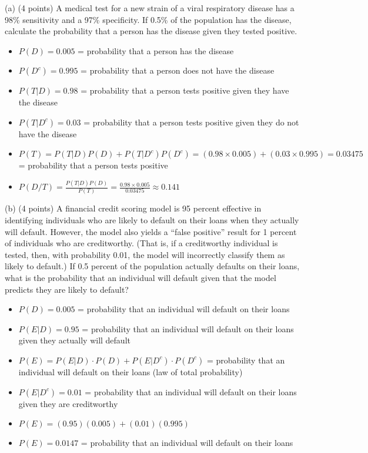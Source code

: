 \documentclass{article}
\begin{document}
(a) (4 points) A medical test for a new strain of a viral respiratory disease has a 98\% sensitivity and
a 97\% specificity. If 0.5\% of the population has the disease, calculate the probability that a person
has the disease given they tested positive.

\begin{itemize}
    \item \(P(D) = 0.005\) = probability that a person has the disease
    \item \(P(D^c) = 0.995\) = probability that a person does not have the disease
    \item \(P(T|D) = 0.98\) = probability that a person tests positive given they have the disease
    \item \(P(T|D^c) = 0.03\) = probability that a person tests positive given they do not have the disease
    \item \(P(T) = P(T|D)P(D) + P(T|D^c)P(D^c) = (0.98 \times 0.005) + (0.03 \times 0.995) = 0.03475\) = probability that a person tests positive
    \item \(P(D/T) = \frac{P(T|D)P(D)}{P(T)} = \frac{0.98 \times 0.005}{0.03475} \approx 0.141\)
\end{itemize}


(b) (4 points) A financial credit scoring model is 95 percent effective in identifying individuals who
are likely to default on their loans when they actually will default. However, the model also yields a
“false positive” result for 1 percent of individuals who are creditworthy. (That is, if a creditworthy
individual is tested, then, with probability 0.01, the model will incorrectly classify them as likely
to default.) If 0.5 percent of the population actually defaults on their loans, what is the probability
that an individual will default given that the model predicts they are likely to default?

\begin{itemize}
    \item \(P(D) = 0.005\) = probability that an individual will default on their loans
    \item \(P(E|D) = 0.95\) = probability that an individual will default on their loans given they actually will default
    \item \(P(E) = P(E|D) \cdot P(D) + P(E|D^c) \cdot P(D^c)\) = probability that an individual will default on their loans (law of total probability)
    \item \(P(E|D^c) = 0.01\) = probability that an individual will default on their loans given they are creditworthy
    \item \(P(E) = (0.95)(0.005) + (0.01)(0.995)\)
    \item \(P(E) = 0.0147\) = probability that an individual will default on their loans
\end{itemize}
\end{document}
